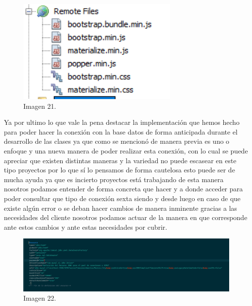\documentclass[10pt,a4paper]{article}
\begin{document}
\begin{figure}[h]
\centering
\includegraphics[width=8cm]{10_descripciondirectorio}
\caption{Imagen 21.}
\label{fig:figure1}
\end{figure}

Ya por ultimo lo que vale la pena destacar la implementación que hemos hecho para poder hacer la conexión con la base datos de forma anticipada durante el desarrollo de las clases ya que como se mencionó de manera previa es uno o enfoque y una nueva manera de poder realizar esta conexión, con lo cual se puede apreciar que existen distintas maneras y la variedad no puede escasear en este tipo proyectos por lo que sí lo pensamos de forma cautelosa esto puede ser de mucha ayuda ya que es incierto proyectos está trabajando de esta manera nosotros podamos entender de forma concreta que hacer y a donde acceder para poder consultar que tipo de conexión sexta siendo y desde luego en caso de que existe algún error o se deban hacer cambios de manera inminente gracias a las necesidades del cliente nosotros podamos actuar de la manera en que corresponde ante estos cambios y ante estas necesidades por cubrir.
\begin{figure}[h]
\centering
\includegraphics[width=17cm]{10_descripciondirectorio1}
\caption{Imagen 22.}
\label{fig:figure1}
\end{figure}

\vspace{300mm}
\end{document}

